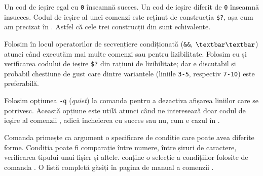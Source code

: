 Un cod de ieșire egal cu \texttt{0} înseamnă succes.
Un cod de ieșire diferit de \texttt{0} înseamnă insucces.
Codul de ieșire al unei comenzi este reținut de construcția \texttt{\$?}, așa cum am precizat în .
Astfel că cele trei construcții din  sunt echivalente.


Folosim  în locul operatorilor de secvențiere condiționată (\texttt{\&\&}, \texttt{$\textbar\textbar$}) atunci când executăm mai multe comenzi sau pentru lizibilitate.
Folosim  cu  și verificarea codului de ieșire \texttt{\$?} din rațiuni de lizibilitate; dar e discutabil și probabil chestiune de gust care dintre variantele (liniile \texttt{3-5}, respectiv \texttt{7-10}) este preferabilă.

\begin{note}
  Folosim opțiunea \texttt{-q} (\textit{quiet}) la comanda  pentru a dezactiva afișarea liniilor care se potrivesc.
  Această opțiune este utilă atunci când ne interesează doar codul de ieșire al comenzii , adică încheierea cu succes sau nu, cum e cazul în .
\end{note}

Comanda  primește ca argument o specificare de condiție care poate avea diferite forme.
Condiția poate fi comparație între numere, între șiruri de caractere, verificarea tipului unui fișier și altele.
 conține o selecție a condițiilor folosite de comanda .
O listă completă găsiți în pagina de manual a comenzii .

